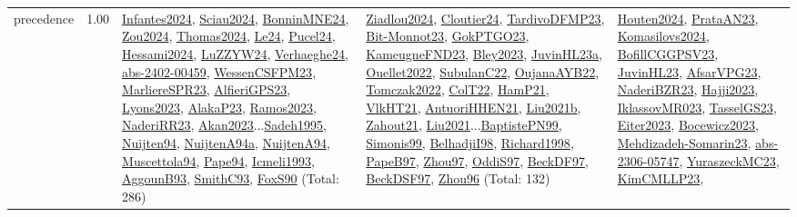 {\begin{longtable}{p{3cm}r>{\raggedright\arraybackslash}p{6cm}>{\raggedright\arraybackslash}p{6cm}>{\raggedright\arraybackslash}p{8cm}}
\index{precedence}\index{Concepts!precedence}precedence &  1.00 & \hyperref[detail:Infantes2024]{Infantes2024}, \hyperref[detail:Sciau2024]{Sciau2024}, \hyperref[detail:BonninMNE24]{BonninMNE24}, \hyperref[detail:Zou2024]{Zou2024}, \hyperref[detail:Thomas2024]{Thomas2024}, \hyperref[detail:Le24]{Le24}, \hyperref[detail:Pucel24]{Pucel24}, \hyperref[detail:Hessami2024]{Hessami2024}, \hyperref[detail:LuZZYW24]{LuZZYW24}, \hyperref[detail:Verhaeghe24]{Verhaeghe24}, \hyperref[detail:abs-2402-00459]{abs-2402-00459}, \hyperref[detail:WessenCSFPM23]{WessenCSFPM23}, \hyperref[detail:MarliereSPR23]{MarliereSPR23}, \hyperref[detail:AlfieriGPS23]{AlfieriGPS23}, \hyperref[detail:Lyons2023]{Lyons2023}, \hyperref[detail:AlakaP23]{AlakaP23}, \hyperref[detail:Ramos2023]{Ramos2023}, \hyperref[detail:NaderiRR23]{NaderiRR23}, \hyperref[detail:Akan2023]{Akan2023}...\hyperref[detail:Sadeh1995]{Sadeh1995}, \hyperref[detail:Nuijten94]{Nuijten94}, \hyperref[detail:NuijtenA94a]{NuijtenA94a}, \hyperref[detail:NuijtenA94]{NuijtenA94}, \hyperref[detail:Muscettola94]{Muscettola94}, \hyperref[detail:Pape94]{Pape94}, \hyperref[detail:Icmeli1993]{Icmeli1993}, \hyperref[detail:AggounB93]{AggounB93}, \hyperref[detail:SmithC93]{SmithC93}, \hyperref[detail:FoxS90]{FoxS90} (Total: 286) & \hyperref[detail:Ziadlou2024]{Ziadlou2024}, \hyperref[detail:Cloutier24]{Cloutier24}, \hyperref[detail:TardivoDFMP23]{TardivoDFMP23}, \hyperref[detail:Bit-Monnot23]{Bit-Monnot23}, \hyperref[detail:GokPTGO23]{GokPTGO23}, \hyperref[detail:KameugneFND23]{KameugneFND23}, \hyperref[detail:Bley2023]{Bley2023}, \hyperref[detail:JuvinHL23a]{JuvinHL23a}, \hyperref[detail:Ouellet2022]{Ouellet2022}, \hyperref[detail:SubulanC22]{SubulanC22}, \hyperref[detail:OujanaAYB22]{OujanaAYB22}, \hyperref[detail:Tomczak2022]{Tomczak2022}, \hyperref[detail:ColT22]{ColT22}, \hyperref[detail:HamP21]{HamP21}, \hyperref[detail:VlkHT21]{VlkHT21}, \hyperref[detail:AntuoriHHEN21]{AntuoriHHEN21}, \hyperref[detail:Liu2021b]{Liu2021b}, \hyperref[detail:Zahout21]{Zahout21}, \hyperref[detail:Liu2021]{Liu2021}...\hyperref[detail:BaptistePN99]{BaptistePN99}, \hyperref[detail:Simonis99]{Simonis99}, \hyperref[detail:BelhadjiI98]{BelhadjiI98}, \hyperref[detail:Richard1998]{Richard1998}, \hyperref[detail:PapeB97]{PapeB97}, \hyperref[detail:Zhou97]{Zhou97}, \hyperref[detail:OddiS97]{OddiS97}, \hyperref[detail:BeckDF97]{BeckDF97}, \hyperref[detail:BeckDSF97]{BeckDSF97}, \hyperref[detail:Zhou96]{Zhou96} (Total: 132) & \hyperref[detail:Houten2024]{Houten2024}, \hyperref[detail:PrataAN23]{PrataAN23}, \hyperref[detail:Komasilovs2024]{Komasilovs2024}, \hyperref[detail:BofillCGGPSV23]{BofillCGGPSV23}, \hyperref[detail:JuvinHL23]{JuvinHL23}, \hyperref[detail:AfsarVPG23]{AfsarVPG23}, \hyperref[detail:NaderiBZR23]{NaderiBZR23}, \hyperref[detail:Hajji2023]{Hajji2023}, \hyperref[detail:IklassovMR023]{IklassovMR023}, \hyperref[detail:TasselGS23]{TasselGS23}, \hyperref[detail:Eiter2023]{Eiter2023}, \hyperref[detail:Bocewicz2023]{Bocewicz2023}, \hyperref[detail:Mehdizadeh-Somarin23]{Mehdizadeh-Somarin23}, \hyperref[detail:abs-2306-05747]{abs-2306-05747}, \hyperref[detail:YuraszeckMC23]{YuraszeckMC23}, \hyperref[detail:KimCMLLP23]{KimCMLLP23}, 
\end{longtable}}
